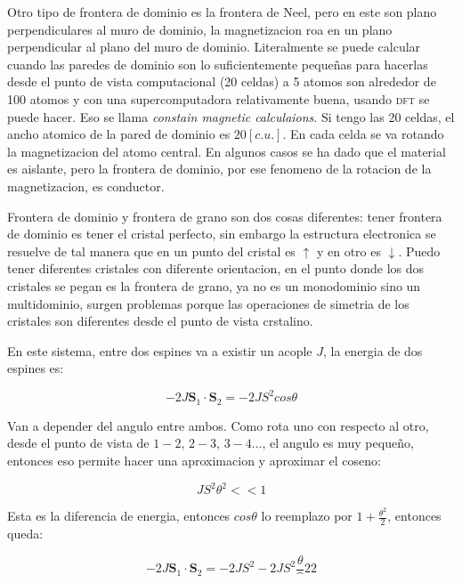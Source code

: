 \documentclass[11pt,fleqn]{book}
\renewcommand{\vec}[1]{\mathbf{#1}}
\begin{document}

Otro tipo de frontera de dominio es la frontera de Neel, pero en este son plano perpendiculares al muro de dominio, la magnetizacion roa en un plano perpendicular al plano del muro de dominio. Literalmente se puede calcular cuando las paredes de dominio son lo suficientemente pequeñas para hacerlas desde el punto de vista computacional (20 celdas) a 5 atomos son alrededor de 100 atomos y con una supercomputadora relativamente buena, usando \textsc{dft} se puede hacer. Eso se llama \emph{constain magnetic calculaions}. Si tengo las 20 celdas, el ancho atomico de la pared de dominio es $20 [c.u.]$. En cada celda se va rotando la magnetizacion del atomo central. En algunos casos se ha dado que el material es aislante, pero la frontera de dominio, por ese fenomeno de la rotacion de la magnetizacion, es conductor.  

Frontera de dominio y frontera de grano son dos cosas diferentes: tener frontera de dominio es tener el cristal perfecto, sin embargo la estructura electronica se resuelve de tal manera que en un punto del cristal es $\uparrow$ y en otro es $\downarrow$. Puedo tener diferentes cristales con diferente orientacion, en el punto donde los dos cristales se pegan es la frontera de grano, ya no es un monodominio sino un multidominio, surgen problemas porque las operaciones de simetria de los cristales son diferentes desde el punto de vista crstalino.


En este sistema, entre dos espines va a existir un acople $J$, la energia de dos espines es:

\begin{equation}
    -2J\vec{S}_{1}\cdot\vec{S}_{2} =-2JS^{2}cos\theta
\end{equation}

Van a depender del angulo entre ambos. Como rota uno con respecto al otro, desde el punto de vista de $1-2$, $2-3$, $3-4$..., el angulo es muy pequeño, entonces eso permite hacer una aproximacion y aproximar el coseno:

\begin{equation}
    JS^{2}\theta^{2}<<1
\end{equation}
 
Esta es la diferencia de energia, entonces $cos\theta$ lo reemplazo por $1+\frac{\theta^{2}}{2}$, entonces queda:

\begin{equation}
    -2J\vec{S}_{1}\cdot\vec{S}_{2}=-2JS^{2}-2JS^{2}\frac\theta^{2}{2}
\end{equation}
\end{document}

